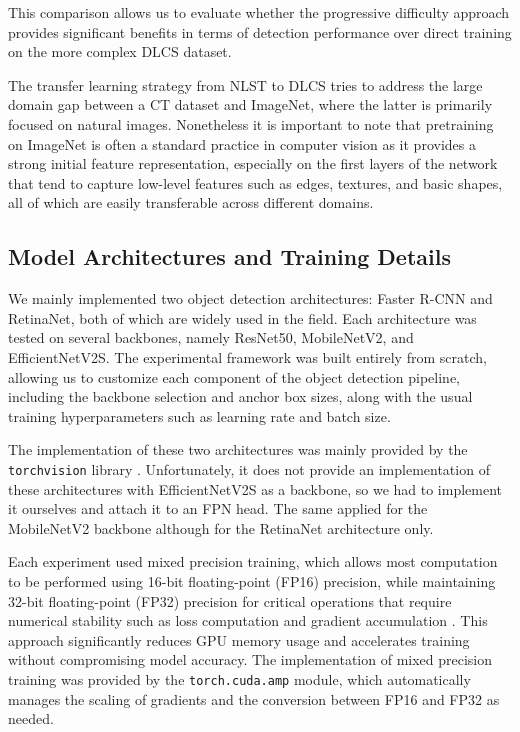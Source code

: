 This comparison allows us to evaluate whether the progressive difficulty approach provides significant benefits in terms of detection performance over direct training on the more complex DLCS dataset. 

The transfer learning strategy from NLST to DLCS tries to address the large domain gap between a CT dataset and ImageNet, where the latter is primarily focused on natural images. Nonetheless it is important to note that pretraining on ImageNet is often a standard practice in computer vision as it provides a strong initial feature representation, especially on the first layers of the network that tend to capture low-level features such as edges, textures, and basic shapes, all of which are easily transferable across different domains.

\subsection{Model Architectures and Training Details}
We mainly implemented two object detection architectures: Faster R-CNN and RetinaNet, both of which are widely used in the field. Each architecture was tested on several backbones, namely ResNet50, MobileNetV2, and EfficientNetV2S.
The experimental framework was built entirely from scratch, allowing us to customize each component of the object detection pipeline, including the backbone selection and anchor box sizes, along with the usual training hyperparameters such as learning rate and batch size.

The implementation of these two architectures was mainly provided by the \texttt{torchvision} library \cite{torchvision2016} . Unfortunately, it does not provide an implementation of these architectures with EfficientNetV2S as a backbone, so we had to implement it ourselves and attach it to an FPN head. The same applied for the MobileNetV2 backbone although for the RetinaNet architecture only. 

Each experiment used mixed precision training, which allows most computation to be performed using 16-bit floating-point (FP16) precision, while maintaining 32-bit floating-point (FP32) precision for critical operations that require numerical stability such as loss computation and gradient accumulation \cite{micikevicius2018mixedprecisiontraining}.
This approach significantly reduces GPU memory usage and accelerates training without compromising model accuracy. The implementation of mixed precision training was provided by the \texttt{torch.cuda.amp} module, which automatically manages the scaling of gradients and the conversion between FP16 and FP32 as needed. 

